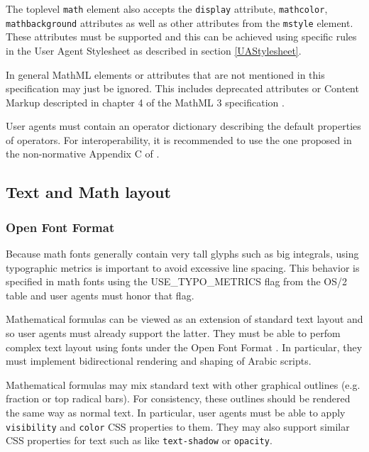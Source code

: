 The toplevel {\tt math} element also accepts the {\tt display} attribute,
{\tt mathcolor}, {\tt mathbackground} attributes as well as other attributes
from the {\tt mstyle} element. These attributes must be supported and this
can be achieved using specific rules in the User Agent Stylesheet
as described in section \ref{UAStylesheet}.

In general MathML elements or attributes that are not mentioned in this
specification may just be ignored. This includes deprecated attributes or
Content Markup descripted in chapter 4 of the MathML 3 specification
\cite{MathML3}.

User agents must contain an operator dictionary describing the default
properties of operators. For interoperability, it is recommended to use the one
proposed in the non-normative Appendix C of \cite{MathML3}.

\subsection{Text and Math layout}

\subsubsection{Open Font Format}

Because math fonts generally contain very tall glyphs such as big integrals,
using typographic metrics is important to avoid excessive line spacing. This
behavior is specified in math fonts using the USE\_TYPO\_METRICS flag from the
OS/2 table \cite{OpenFontFormat3} and user agents must honor that flag.

Mathematical formulas can be viewed as an extension of standard text layout
and so user agents must already support the latter. They must be able to perfom
complex text layout \cite{CTL} using fonts under the Open Font Format
\cite{OpenFontFormat3}. In particular, they must implement bidirectional
rendering and shaping of Arabic scripts.

Mathematical formulas may mix standard text with other graphical outlines
(e.g. fraction or top radical bars). For consistency, these outlines should
be rendered the same way as normal text. In particular, user agents must be
able to apply {\tt visibility} and {\tt color} CSS properties to them. They may
also support similar CSS properties for text such as like {\tt text-shadow} or
{\tt opacity}.


